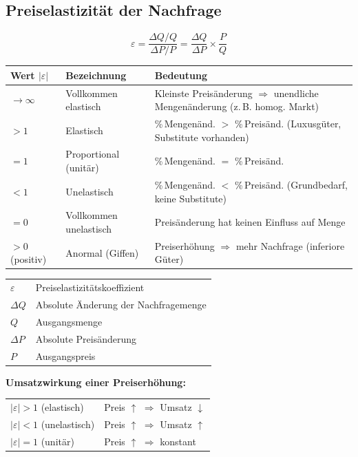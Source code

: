 \documentclass[10pt,a4paper]{article}
\begin{document}
\begin{multicols}{2}
\columnbreak

\subsection{Preiselastizität der Nachfrage}

\begin{vwlbox}
\[
\varepsilon = \frac{\Delta Q / Q}{\Delta P / P}
= \frac{\Delta Q}{\Delta P} \times \frac{P}{Q}
\]
\end{vwlbox}

\begin{tabular}{|L{1.8cm}|L{2.2cm}|L{3cm}|}
\hline
{}
\textbf{Wert $|\varepsilon|$} & \textbf{Bezeichnung} & \textbf{Bedeutung} \\
\hline
$\to \infty$ & Vollkommen elastisch & Kleinste Preisänderung $\Rightarrow$ unendliche Mengenänderung (z.\,B. homog. Markt) \\
\hline
$> 1$ & Elastisch & \%\,Mengenänd. $>$ \%\,Preisänd. (Luxusgüter, Substitute vorhanden) \\
\hline
$= 1$ & Proportional (unitär) & \%\,Mengenänd. $=$ \%\,Preisänd. \\
\hline
$< 1$ & Unelastisch & \%\,Mengenänd. $<$ \%\,Preisänd. (Grundbedarf, keine Substitute) \\
\hline
$= 0$ & Vollkommen unelastisch & Preisänderung hat keinen Einfluss auf Menge \\
\hline
$> 0$ (positiv) & Anormal (Giffen) & Preiserhöhung $\Rightarrow$ mehr Nachfrage (inferiore Güter) \\
\hline
\end{tabular}

\vspace{4pt}
\begin{tabular}{|L{2cm}|L{5cm}|}
\hline
{}
$\varepsilon$ & Preiselastizitätskoeffizient \\
$\Delta Q$ & Absolute Änderung der Nachfragemenge \\
$Q$ & Ausgangsmenge \\
$\Delta P$ & Absolute Preisänderung \\
$P$ & Ausgangspreis \\
\hline
\end{tabular}

\vspace{4pt}
\textbf{Umsatzwirkung einer Preiserhöhung:}\par
\begin{tabular}{|L{3cm}|L{4cm}|}
\hline
$|\varepsilon| > 1$ (elastisch) & Preis $\uparrow$ $\Rightarrow$ Umsatz $\downarrow$ \\
$|\varepsilon| < 1$ (unelastisch) & Preis $\uparrow$ $\Rightarrow$ Umsatz $\uparrow$ \\
$|\varepsilon| = 1$ (unitär) & Preis $\uparrow$ $\Rightarrow$ konstant \\
\hline
\end{tabular}


\end{multicols}
\end{document}
